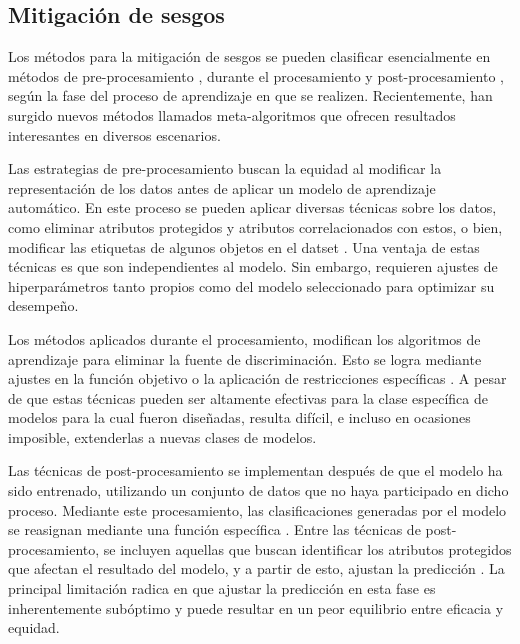 \subsection{Mitigaci\'on de sesgos}

Los m\'etodos para la mitigaci\'on de sesgos se pueden clasificar esencialmente en m\'etodos de pre-procesamiento \cite{osti_10182459}, 
durante el procesamiento \cite{ml_in_admissions} y post-procesamiento \cite{gitiaux2019multidifferential}, seg\'un la fase del proceso de 
aprendizaje en que se realizen. Recientemente, han surgido nuevos m\'etodos llamados meta-algoritmos que ofrecen resultados interesantes 
en diversos escenarios.

Las estrategias de pre-procesamiento buscan la equidad al modificar la representaci\'on de los datos antes de aplicar un modelo de aprendizaje
autom\'atico. En este proceso se pueden aplicar diversas t\'ecnicas sobre los datos, como eliminar atributos protegidos y atributos correlacionados
con estos, o bien, modificar las etiquetas de algunos objetos en el datset \cite{preproc}. Una ventaja de estas t\'ecnicas es que son independientes
al modelo. Sin embargo, requieren ajustes de hiperpar\'ametros tanto propios como del modelo seleccionado para optimizar su desempe\~no.

Los m\'etodos aplicados durante el procesamiento, modifican los algoritmos de aprendizaje para eliminar la fuente de discriminaci\'on. Esto se 
logra mediante ajustes en la funci\'on objetivo o la aplicaci\'on de restricciones espec\'ificas \cite{donini2020empirical,zafar17a}. A pesar de 
que estas t\'ecnicas pueden ser altamente efectivas para la clase espec\'ifica de modelos para la cual fueron dise\~nadas, resulta dif\'icil, e 
incluso en ocasiones imposible, extenderlas a nuevas clases de modelos.

Las t\'ecnicas de post-procesamiento se implementan despu\'es de que el modelo ha sido entrenado, utilizando un conjunto de datos que no haya
participado en dicho proceso. Mediante este procesamiento, las clasificaciones generadas por el modelo se reasignan mediante una funci\'on 
espec\'ifica \cite{d_Alessandro_2017}.
Entre las t\'ecnicas de post-procesamiento, se incluyen aquellas que buscan identificar los atributos protegidos que afectan el resultado del 
modelo, y a partir de esto, ajustan la predicci\'on \cite{seymour2018bias}. La principal limitaci\'on radica en que ajustar la predicci\'on 
en esta fase es inherentemente sub\'optimo y puede resultar en un peor equilibrio entre eficacia y equidad.

